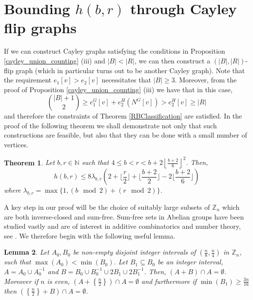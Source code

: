 \documentclass[a4paper,12pt]{article}
\newtheorem{theorem}{Theorem}[section]
\newtheorem{lemma}[theorem]{Lemma}
\begin{document}
\section{Bounding $h(b, r)$ through Cayley flip graphs}

If we can construct Cayley graphs satisfying the conditions in Proposition \ref{cayley_union_counting} (iii) and $|B| < |R|$, we can then construct a $\left(|B|, |R|\right)$-flip graph (which in particular turns out to be another Cayley graph). Note that the requirement $e_1 [v] > e_2 [v]$ necessitates that $|B| \geq 3$. Moreover, from the proof of Proposition \ref{cayley_union_counting} (iii) we have that in this case, $$\binom{|B| + 1}{2} \geq e_1^G [v] + e_2^H \left(N^G [v]\right) > e_2^H [v] \geq |R|$$ and therefore the constraints of Theorem \ref{RBClassification} are satisfied. In the proof of the following theorem we shall demonstrate not only that such constructions are feasible, but also that they can be done with a small number of vertices.

\begin{theorem}\label{newBound}
Let $b, r \in \mathbb{N}$ such that $4 \leq b < r < b + 2 \left\lfloor\frac{b+2}{6}\right\rfloor^2$. Then,
$$h(b, r) \leq 8 \lambda_{b,r}\left(2 + \bigg\lfloor\dfrac{r}{2}\bigg\rfloor + \bigg\lfloor\dfrac{b+2}{2}\bigg\rfloor - 2\bigg\lfloor\dfrac{b+2}{6}\bigg\rfloor\right)$$ where $\lambda_{b, r} = \max\{1, \left(b \mod 2\right) + \left( r \mod 2\right)\}$.
\end{theorem}

A key step in our proof will be the choice of suitably large subsets of $\mathbb{Z}_n$ which are both inverse-closed and sum-free. Sum-free sets in Abelian groups have been studied vastly and are of interest in additive combinatorics and number theory, see \cite{Alon_Kleitman_1990, GreenBen2005Ssia, TaoVan}. We therefore begin with the following useful lemma.

\begin{lemma}\label{sumsetLemma}
	Let $A_0, B_0$ be non-empty disjoint integer intervals of $\left(\frac{n}{8}, \frac{n}{4}\right)$ in $\mathbb{Z}_{n}$, such that $\max(A_0) < \min(B_0)$. Let $B_1 \subseteq B_0$ be an integer interval, $A = A_0 \cup A_0^{-1}$ and $B = B_0 \cup B_0^{-1} \cup 2B_1 \cup 2B_1^{-1}$. Then, $\left(A + B\right) \cap A = \emptyset$. Moreover if $n$ is even, $\left(A + \left\{\frac{n}{2}\right\}\right) \cap A = \emptyset$ and furthermore if $\min(B_1) \geq \frac{3n}{16}$ then $\left(\left\{\frac{n}{2}\right\} + B\right) \cap A = \emptyset$.
\end{lemma}
\end{document}
